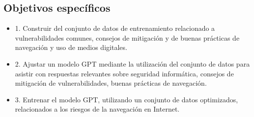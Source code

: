 \subsection{Objetivos específicos}\label{section:Objetivos del proyecto}
 \begin{itemize}
        \item 1.	Construir del conjunto de datos de entrenamiento relacionado a vulnerabilidades comunes, consejos de mitigación y de buenas prácticas de navegación y uso de medios digitales.
        \item 2.	Ajustar un modelo GPT mediante la utilización del conjunto de datos para asistir con respuestas relevantes sobre seguridad informática, consejos de mitigación de vulnerabilidades, buenas prácticas de navegación.
        \item 3.	Entrenar el modelo GPT, utilizando un conjunto de datos optimizados, relacionados a los riesgos de la navegación en Internet. 
    \end{itemize}
    

